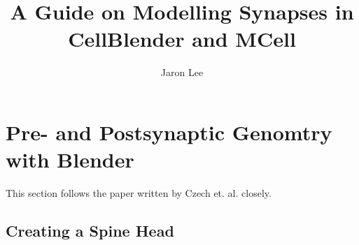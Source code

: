 \documentclass[twoside,a4paper]{refart}
\title{A Guide on Modelling Synapses in CellBlender and MCell}
\author{Jaron Lee}
\date{}
\begin{document}
\maketitle

\begin{abstract}
\end{abstract}

\newpage



\section{Pre- and Postsynaptic Genomtry with Blender}
This section follows the paper written by Czech et. al. closely.

\subsection{Creating a Spine Head}
\end{document}
